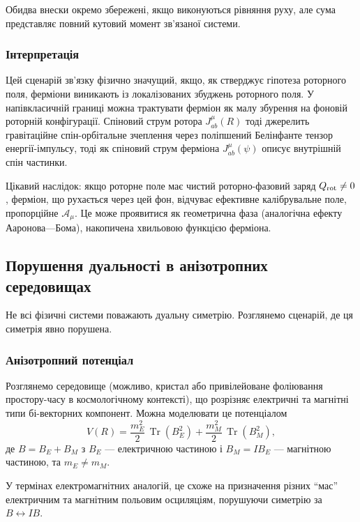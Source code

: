 \documentclass[11pt,a4paper]{article}
\numberwithin{equation}{section}
\theoremstyle{plain}
\theoremstyle{definition}
\theoremstyle{remark}
\DeclareMathOperator{\Tr}{Tr}
\begin{document}
Обидва внески окремо збережені, якщо виконуються рівняння руху, але сума представляє повний кутовий момент зв'язаної системи.

\subsubsection{Інтерпретація}

Цей сценарій зв'язку фізично значущий, якщо, як стверджує гіпотеза роторного поля, ферміони виникають із локалізованих збуджень роторного поля. У напівкласичній границі можна трактувати ферміон як малу збурення на фоновій роторній конфігурації. Спіновий струм ротора $J^\mu_{ab}(R)$ тоді джерелить гравітаційне спін-орбітальне зчеплення через поліпшений Белінфанте тензор енергії-імпульсу, тоді як спіновий струм ферміона $J^\mu_{ab}(\psi)$ описує внутрішній спін частинки.

Цікавий наслідок: якщо роторне поле має чистий роторно-фазовий заряд $Q_{\rm rot} \neq 0$, ферміон, що рухається через цей фон, відчуває ефективне калібрувальне поле, пропорційне $\mathcal{A}_\mu$. Це може проявитися як геометрична фаза (аналогічна ефекту Ааронова—Бома), накопичена хвильовою функцією ферміона.

\subsection{Порушення дуальності в анізотропних середовищах}

Не всі фізичні системи поважають дуальну симетрію. Розглянемо сценарій, де ця симетрія явно порушена.

\subsubsection{Анізотропний потенціал}

Розглянемо середовище (можливо, кристал або привілейоване фоліювання простору-часу в космологічному контексті), що розрізняє електричні та магнітні типи бі-векторних компонент. Можна моделювати це потенціалом
\begin{equation}
V(R) = \frac{m_E^2}{2}\,\Tr(B_E^2) + \frac{m_M^2}{2}\,\Tr(B_M^2),
\end{equation}
де $B = B_E + B_M$ з $B_E$ — електричною частиною і $B_M = IB_E$ — магнітною частиною, та $m_E \neq m_M$.

У термінах електромагнітних аналогій, це схоже на призначення різних ``мас'' електричним та магнітним польовим осциляціям, порушуючи симетрію за $B \leftrightarrow IB$.
\end{document}
